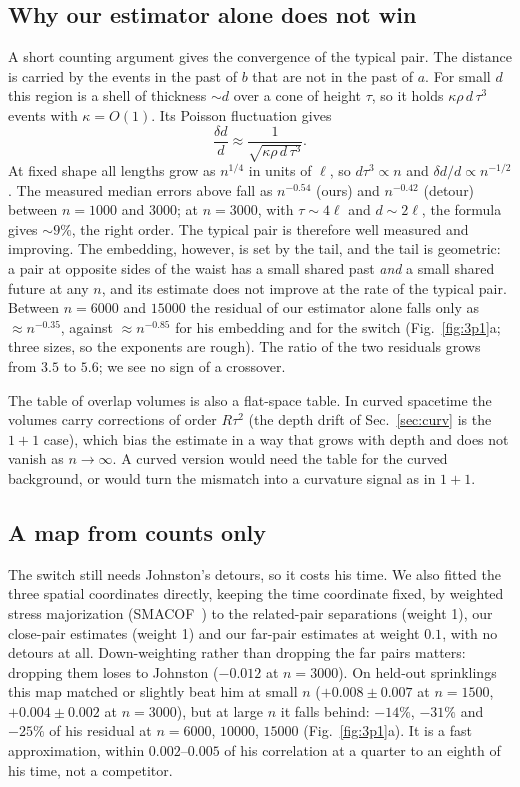\documentclass[11pt,a4paper]{article}
\begin{document}
\subsection{Why our estimator alone does not win}\label{sec:conv}
A short counting argument gives the convergence of the typical pair. The distance is carried by the events in the past of $b$ that are not in the past of $a$. For small $d$ this region is a shell of thickness $\sim d$ over a cone of height $\tau$, so it holds $\kappa\rho\,d\,\tau^3$ events with $\kappa=O(1)$. Its Poisson fluctuation gives
\begin{equation}
\frac{\delta d}{d}\approx\frac1{\sqrt{\kappa\rho\,d\,\tau^3}}.
\end{equation}
At fixed shape all lengths grow as $n^{1/4}$ in units of $\ell$, so $d\tau^3\propto n$ and $\delta d/d\propto n^{-1/2}$. The measured median errors above fall as $n^{-0.54}$ (ours) and $n^{-0.42}$ (detour) between $n=1000$ and $3000$; at $n=3000$, with $\tau\sim4\ell$ and $d\sim2\ell$, the formula gives $\sim9\%$, the right order. The typical pair is therefore well measured and improving. The embedding, however, is set by the tail, and the tail is geometric: a pair at opposite sides of the waist has a small shared past \emph{and} a small shared future at any $n$, and its estimate does not improve at the rate of the typical pair. Between $n=6000$ and $15000$ the residual of our estimator alone falls only as $\approx n^{-0.35}$, against $\approx n^{-0.85}$ for his embedding and for the switch (Fig.~\ref{fig:3p1}a; three sizes, so the exponents are rough). The ratio of the two residuals grows from $3.5$ to $5.6$; we see no sign of a crossover.

The table of overlap volumes is also a flat-space table. In curved spacetime the volumes carry corrections of order $R\tau^2$ (the depth drift of Sec.~\ref{sec:curv} is the $1+1$ case), which bias the estimate in a way that grows with depth and does not vanish as $n\to\infty$. A curved version would need the table for the curved background, or would turn the mismatch into a curvature signal as in $1+1$.

\subsection{A map from counts only}\label{sec:cmap}
The switch still needs Johnston's detours, so it costs his time. We also fitted the three spatial coordinates directly, keeping the time coordinate fixed, by weighted stress majorization (SMACOF~\cite{deLeeuwMair09}) to the related-pair separations (weight 1), our close-pair estimates (weight 1) and our far-pair estimates at weight $0.1$, with no detours at all. Down-weighting rather than dropping the far pairs matters: dropping them loses to Johnston ($-0.012$ at $n=3000$). On held-out sprinklings this map matched or slightly beat him at small $n$ ($+0.008\pm0.007$ at $n=1500$, $+0.004\pm0.002$ at $n=3000$), but at large $n$ it falls behind: $-14\%$, $-31\%$ and $-25\%$ of his residual at $n=6000$, $10000$, $15000$ (Fig.~\ref{fig:3p1}a). It is a fast approximation, within $0.002$--$0.005$ of his correlation at a quarter to an eighth of his time, not a competitor.
\end{document}
